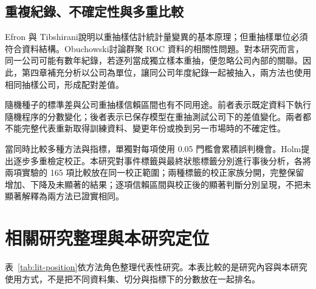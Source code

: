 \subsection{重複紀錄、不確定性與多重比較}

Efron 與 Tibshirani\autocite{efron1986bootstrap}說明以重抽樣估計統計量變異的基本原理；但重抽樣單位必須符合資料結構。Obuchowski\autocite{obuchowski1997clustered}討論群聚 ROC 資料的相關性問題。對本研究而言，同一公司可能有數年紀錄，若逐列當成獨立樣本重抽，便忽略公司內部的關聯。因此，第四章補充分析以公司為單位，讓同公司年度紀錄一起被抽入，兩方法也使用相同抽樣公司，形成配對差值。

隨機種子的標準差與公司重抽樣信賴區間也有不同用途。前者表示既定資料下執行隨機程序的分數變化；後者表示已保存模型在重抽測試公司下的差值變化。兩者都不能完整代表重新取得訓練資料、變更年份或換到另一市場時的不確定性。

當同時比較多種方法與指標，單獨對每項使用 0.05 門檻會累積誤判機會。Holm\autocite{holm1979multiple}提出逐步多重檢定校正。本研究對事件標籤與最終狀態標籤分別進行事後分析，各將兩項實驗的 165 項比較放在同一校正範圍；兩種標籤的校正家族分開，完整保留增加、下降及未顯著的結果；逐項信賴區間與校正後的顯著判斷分別呈現，不把未顯著解釋為兩方法已證實相同。

\section{相關研究整理與本研究定位}

表~\ref{tab:lit-position}依方法角色整理代表性研究。本表比較的是研究內容與本研究使用方式，不是把不同資料集、切分與指標下的分數放在一起排名。

